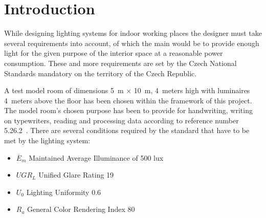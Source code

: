 \section{Introduction} \label{sec:intro}
While designing lighting systems for indoor working places the designer must take several requirements into account, of which the main would be to provide enough light for the given purpose of the interior space at a reasonable power consumption. These and more requirements are set by the Czech National Standards \cite{12464} mandatory on the territory of the Czech Republic.

A test model room of dimensions 5~m $\times$ 10~m, 4~meters high with luminaires 4~meters above the floor has been chosen within the framework of this project. The model room's chosen purpose has been to provide for handwriting, writing on typewriters, reading and processing data according to reference number 5.26.2~\cite{12464}. There are several conditions required by the standard that have to be met by the lighting system:


\begin{itemize}
	\item $\overline{E}_{m}$ Maintained Average Illuminance of 500 lux
	\item $UGR_{L}$ Unified Glare Rating 19
	\item $U_{0}$ Lighting Uniformity 0.6
	\item $R_{a}$ General Color Rendering Index 80
\end{itemize}

